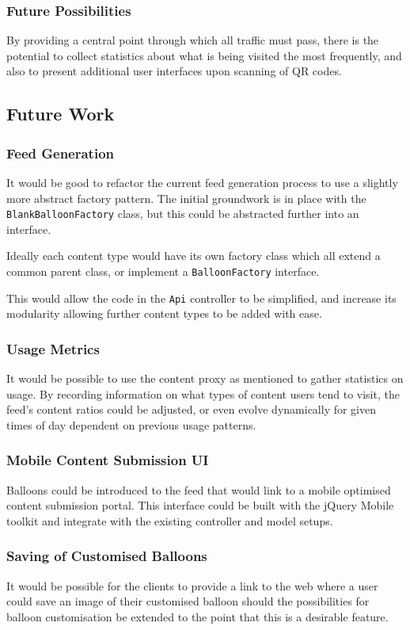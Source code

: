 \subsubsection{Future Possibilities}
By providing a central point through which all traffic must pass, there is the potential to collect statistics about what is being visited the most frequently, and also to present additional user interfaces upon scanning of QR codes.

\subsection{Future Work}

\subsubsection{Feed Generation}
It would be good to refactor the current feed generation process to use a slightly more abstract factory pattern. The initial groundwork is in place with the \texttt{BlankBalloonFactory} class, but this could be abstracted further into an interface.

Ideally each content type would have its own factory class which all extend a common parent class, or implement a \texttt{BalloonFactory} interface.

This would allow the code in the \texttt{Api} controller to be simplified, and increase its modularity allowing further content types to be added with ease.

\subsubsection{Usage Metrics}
It would be possible to use the content proxy as mentioned to gather statistics on usage. By recording information on what types of content users tend to visit, the feed's content ratios could be adjusted, or even evolve dynamically for given times of day dependent on previous usage patterns.

\subsubsection{Mobile Content Submission UI}
Balloons could be introduced to the feed that would link to a mobile optimised content submission portal. This interface could be built with the jQuery Mobile toolkit and integrate with the existing controller and model setups.

\subsubsection{Saving of Customised Balloons}
It would be possible for the clients to provide a link to the web where a user could save an image of their customised balloon should the possibilities for balloon customisation be extended to the point that this is a desirable feature.

